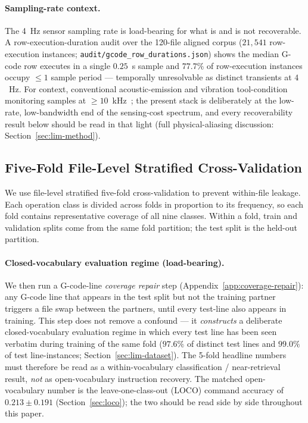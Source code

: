 \documentclass[sensors,article,submit,moreauthors,pdftex]{Definitions/mdpi}
\begin{document}
\paragraph{Sampling-rate context.} The 4~Hz sensor sampling rate is load-bearing for what is and is not recoverable. A row-execution-duration audit over the 120-file aligned corpus ($21{,}541$ row-execution instances; \texttt{audit/gcode\_row\_durations.json}) shows the median G-code row executes in a single $0.25$~s sample and $77.7\%$ of row-execution instances occupy $\le\!1$ sample period --- temporally unresolvable as distinct transients at $4$~Hz. For context, conventional acoustic-emission and vibration tool-condition monitoring samples at $\geq\!10$~kHz~\cite{teti2010advanced}; the present stack is deliberately at the low-rate, low-bandwidth end of the sensing-cost spectrum, and every recoverability result below should be read in that light (full physical-aliasing discussion: Section~\ref{sec:lim-method}).

\subsection{Five-Fold File-Level Stratified Cross-Validation}
\label{sec:cv}

We use file-level stratified five-fold cross-validation to prevent within-file leakage. Each operation class is divided across folds in proportion to its frequency, so each fold contains representative coverage of all nine classes. Within a fold, train and validation splits come from the same fold partition; the test split is the held-out partition.

\paragraph{Closed-vocabulary evaluation regime (load-bearing).} We then run a G-code-line \emph{coverage repair} step (Appendix~\ref{app:coverage-repair}): any G-code line that appears in the test split but not the training partner triggers a file swap between the partners, until every test-line also appears in training. This step does not remove a confound --- it \emph{constructs} a deliberate closed-vocabulary evaluation regime in which every test line has been seen verbatim during training of the same fold ($97.6\%$ of distinct test lines and $99.0\%$ of test line-instances; Section~\ref{sec:lim-dataset}). The 5-fold headline numbers must therefore be read as a within-vocabulary classification / near-retrieval result, \emph{not} as open-vocabulary instruction recovery. The matched open-vocabulary number is the leave-one-class-out (LOCO) command accuracy of $0.213 \pm 0.191$ (Section~\ref{sec:loco}); the two should be read side by side throughout this paper.
\end{document}
